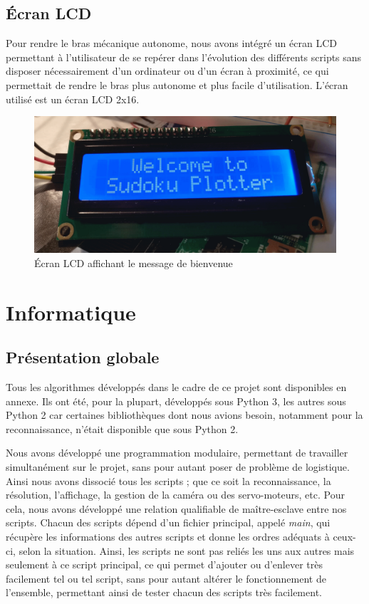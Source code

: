 \documentclass[12pt,a4paper]{report}
\begin{document}
\section{Écran LCD}
Pour rendre le bras mécanique autonome, nous avons intégré un écran LCD permettant à l'utilisateur de se repérer dans l'évolution des différents scripts sans disposer nécessairement d'un ordinateur ou d'un écran à proximité, ce qui permettait de rendre le bras plus autonome et plus facile d'utilisation. L'écran utilisé est un écran LCD 2x16.
\begin{figure}[!h]
 \center
 \includegraphics[scale=0.3]{../pictures/ecran_lcd}
 \caption{\'{E}cran LCD affichant le message de bienvenue}
\end{figure}


	\chapter{Informatique}
\section{Présentation globale}
	Tous les algorithmes développés dans le cadre de ce projet sont disponibles en annexe. Ils ont été, pour la plupart, développés sous Python 3, les autres sous Python 2 car certaines bibliothèques dont nous avions besoin, notamment pour la reconnaissance, n'était disponible que sous Python 2. 
	
	Nous avons développé une programmation modulaire, permettant de travailler simultanément sur le projet, sans pour autant poser de problème de logistique. Ainsi nous avons dissocié tous les scripts ; que ce soit la reconnaissance, la résolution, l'affichage, la gestion de la caméra ou des servo-moteurs, etc. Pour cela, nous avons développé une relation qualifiable de maître-esclave entre nos scripts. Chacun des scripts dépend d'un fichier principal, appelé \emph{main}, qui récupère les informations des autres scripts et donne les ordres adéquats à ceux-ci, selon la situation. Ainsi, les scripts ne sont pas reliés les uns aux autres mais seulement à ce script principal, ce qui permet d'ajouter ou d'enlever très facilement tel ou tel script, sans pour autant altérer le fonctionnement de l'ensemble, permettant ainsi de tester chacun des scripts très facilement.
	
\end{document}
